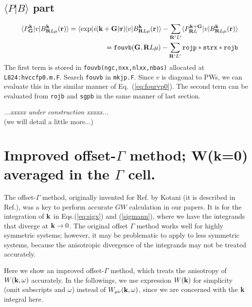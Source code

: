 \documentclass[a4paper,10pt,epsf,fleqn]{article}
\def\underconstruction{{\it...xxxxx under construction xxxxx...\\}}
\newcommand{\bfq}{{\bf q}}
\newcommand{\bfk}{{\bf k}}
\newcommand{\bfr}{{\bf r}}
\newcommand{\bfG}{{\bf G}}
\newcommand{\bfR}{{\bf R}}
\newcommand{\req}[1]{\mbox{Eq.~(\ref{#1})}}
\begin{document}
\subsection{$\langle P|B \rangle$ part}
\begin{eqnarray}
&&\langle {P}^\bfk_{\bfG} |v| B^\bfk_{\bfR{L}\mu}(\bfr) \rangle
=\langle  \exp(i(\bfk+\bfG)\bfr) 
|v|B^\bfk_{\bfR{L}\mu}(\bfr) \rangle
-\sum_{\bfR'{L'}} 
\langle P^{\bfk+\bfG}_{\bfR{L}}|v|
B^\bfk_{\bfR{L}\mu}(\bfr)  \rangle \nonumber \\
&&={\tt fouvb}(\bfG,\bfR L \mu)
-\sum_{\bfR'L'} {\tt rojp * strx * rojb}
\label{eq:pvb}
\end{eqnarray}
The first term is stored in {\tt fouvb(ngc,nxx,nlxx,nbas)} allocated at 
{\tt L824:hvccfp0.m.F}.
Search {\tt fouvb} in {\tt mkjp.F}. 
Since $v$ is diagonal to PWs,
we can evaluate this in the similar manner of \req{eq:fourvp0}.
The second term can be evaluated from 
{\tt rojb} and {\tt sgpb} in the same manner of last section.

\underconstruction(we will detail a little more...)

\section{Improved offset-$\Gamma$ method; 
W(k=0) averaged in the $\Gamma$ cell.}
\label{sec:kint}
The offset-$\Gamma$ method, originally 
invented for Ref.\cite{kotani_all-electron_2002} by Kotani 
(it is described in Ref.\cite{kotani_quasiparticle_2007}), 
was a key to perform accurate $GW$ 
calculation in our papers.
It is for the integration of $\bfk$ 
in Eqs.(\ref{eq:sigx}) and (\ref{sigmann}), where
we have the integrands that diverge at $\bfk \to 0$.
The original offset $\Gamma$ method works well 
for highly symmetric systems; however,
it may be problematic to apply to less symmetric systems, 
because the anisotropic divergence of the integrands 
may not be treated accurately.

Here we show an improved offset-$\Gamma$ method, which treats
the anisotropy of $W(\bfk,\omega)$ accurately.
In the followings, we use expression $W(\bfk)$
for simplicity (omit subscripts and $\omega$)
instead of $W_{\mu \nu}(\bfk,\omega)$, 
since we are concerned with the $\bfk$ integral here.

\end{document}
